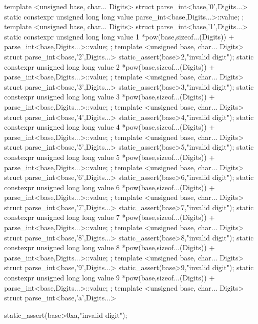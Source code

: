 \documentclass[ebook,11pt,article]{memoir}
\begin{document}
\begin{codeblock}
{{{template <unsigned base, char... Digits>
struct parse_int<base,'0',Digits...>{
    static constexpr unsigned long long value{ parse_int<base,Digits...>::value};
};
template <unsigned base, char... Digits>
struct parse_int<base,'1',Digits...>{
    static constexpr unsigned long long value{ 1 *pow(base,sizeof...(Digits))
                                               + parse_int<base,Digits...>::value};
};
template <unsigned base, char... Digits>
struct parse_int<base,'2',Digits...>{
    static_assert(base>2,"invalid digit");
    static constexpr unsigned long long value{ 2 *pow(base,sizeof...(Digits))
                                               + parse_int<base,Digits...>::value};
};
template <unsigned base, char... Digits>
struct parse_int<base,'3',Digits...>{
    static_assert(base>3,"invalid digit");
    static constexpr unsigned long long value{ 3 *pow(base,sizeof...(Digits))
                                               + parse_int<base,Digits...>::value};
};
template <unsigned base, char... Digits>
struct parse_int<base,'4',Digits...>{
    static_assert(base>4,"invalid digit");
    static constexpr unsigned long long value{ 4 *pow(base,sizeof...(Digits))
                                               + parse_int<base,Digits...>::value};
};
template <unsigned base, char... Digits>
struct parse_int<base,'5',Digits...>{
    static_assert(base>5,"invalid digit");
    static constexpr unsigned long long value{ 5 *pow(base,sizeof...(Digits))
                                               + parse_int<base,Digits...>::value};
};
template <unsigned base, char... Digits>
struct parse_int<base,'6',Digits...>{
    static_assert(base>6,"invalid digit");
    static constexpr unsigned long long value{ 6 *pow(base,sizeof...(Digits))
                                               + parse_int<base,Digits...>::value};
};
template <unsigned base, char... Digits>
struct parse_int<base,'7',Digits...>{
    static_assert(base>7,"invalid digit");
    static constexpr unsigned long long value{ 7 *pow(base,sizeof...(Digits))
                                               + parse_int<base,Digits...>::value};
};
template <unsigned base, char... Digits>
struct parse_int<base,'8',Digits...>{
    static_assert(base>8,"invalid digit");
    static constexpr unsigned long long value{ 8 *pow(base,sizeof...(Digits))
                                               + parse_int<base,Digits...>::value};
};
template <unsigned base, char... Digits>
struct parse_int<base,'9',Digits...>{
    static_assert(base>9,"invalid digit");
    static constexpr unsigned long long value{ 9 *pow(base,sizeof...(Digits))
                                               + parse_int<base,Digits...>::value};
};
template <unsigned base, char... Digits>
struct parse_int<base,'a',Digits...>{
    static_assert(base>0xa,"invalid digit");

}}}}
\end{codeblock}
\end{document}
